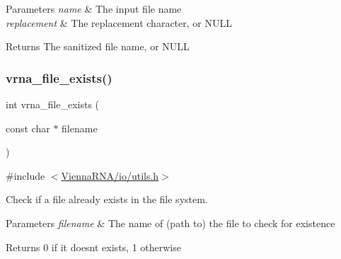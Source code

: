 \begin{DoxyParams}{Parameters}
{\em name} & The input file name \\
\hline
{\em replacement} & The replacement character, or N\+U\+LL \\
\hline
\end{DoxyParams}
\begin{DoxyReturn}{Returns}
The sanitized file name, or N\+U\+LL 
\end{DoxyReturn}
\mbox{\label{group__file__utils_ga80cf1f4bb5704622f72f2911f48aee55}} 
\subsubsection{\texorpdfstring{vrna\+\_\+file\+\_\+exists()}{vrna\_file\_exists()}}
{\footnotesize\ttfamily int vrna\+\_\+file\+\_\+exists (\begin{DoxyParamCaption}\item[{const char $\ast$}]{filename }\end{DoxyParamCaption})}



{\ttfamily \#include $<$\hyperlink{io_2utils_8h}{Vienna\+R\+N\+A/io/utils.\+h}$>$}



Check if a file already exists in the file system. 


\begin{DoxyParams}{Parameters}
{\em filename} & The name of (path to) the file to check for existence \\
\hline
\end{DoxyParams}
\begin{DoxyReturn}{Returns}
0 if it doesn\textquotesingle{}t exists, 1 otherwise 
\end{DoxyReturn}
